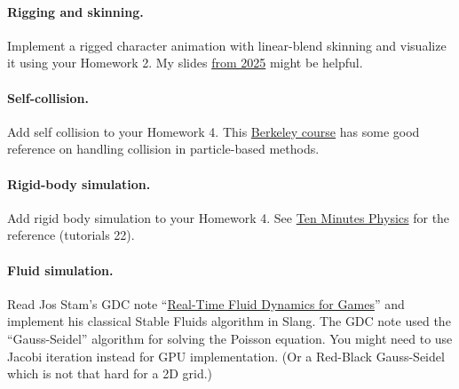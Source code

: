 \paragraph{Rigging and skinning.} Implement a rigged character animation with linear-blend skinning and visualize it using your Homework 2. My slides \href{https://cseweb.ucsd.edu/~tzli/cse167/fa2025/lectures/23_rigging_skinning_blendshapes.pdf}{from 2025} might be helpful.

\paragraph{Self-collision.} Add self collision to your Homework 4. This \href{https://cs184.eecs.berkeley.edu/fa26/hw/hw4/part4/}{Berkeley course} has some good reference on handling collision in particle-based methods.

\paragraph{Rigid-body simulation.} Add rigid body simulation to your Homework 4. See \href{https://matthias-research.github.io/pages/tenMinutePhysics/index.html}{Ten Minutes Physics} for the reference (tutorials 22).

\paragraph{Fluid simulation.} Read Jos Stam's GDC note ``\href{https://www.dgp.toronto.edu/public_user/stam/reality/Research/pdf/GDC03.pdf}{Real-Time Fluid Dynamics for Games}'' and implement his classical Stable Fluids algorithm in Slang. The GDC note used the ``Gauss-Seidel'' algorithm for solving the Poisson equation. You might need to use Jacobi iteration instead for GPU implementation. (Or a Red-Black Gauss-Seidel which is not that hard for a 2D grid.)



